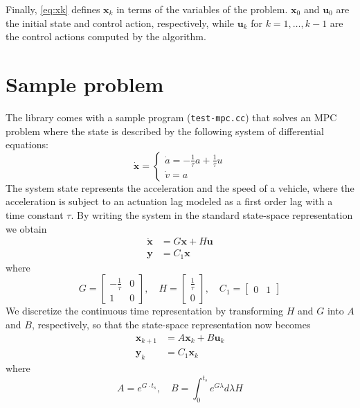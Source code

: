 \documentclass[10pt,a4paper]{article}
\newcommand{\xk}{\ensuremath{\bm{x}_k}\xspace}
\newcommand{\yk}{\ensuremath{\bm{y}_k}\xspace}
\newcommand{\xkk}{\ensuremath{\bm{x}_{k+1}}\xspace}
\newcommand{\xx}[1]{\ensuremath{\bm{x}_{#1}}\xspace}
\newcommand{\uk}{\ensuremath{\bm{u}_k}\xspace}
\newcommand{\uu}[1]{\ensuremath{\bm{u}_{#1}}\xspace}
\newcommand{\ts}{\ensuremath{t_s}}
\newcommand{\Co}{\ensuremath{C_1}}
\begin{document}
Finally, \cref{eq:xk} defines \xk in terms of the variables of the problem.
\xx{0} and \uu{0} are the initial state and control action, respectively, while \uk for $k = 1,\dots,k-1$ are the control actions computed by the algorithm.

\section{Sample problem}

The library comes with a sample program (\texttt{test-mpc.cc}) that solves an MPC problem where the state is described by the following system of differential equations:
\begin{equation}
    \dot{\bm{x}} = \begin{cases}
        \dot{a} = -\frac{1}{\tau} a + \frac{1}{\tau} u\\
        \dot{v} = a
    \end{cases}
\end{equation}
The system state represents the acceleration and the speed of a vehicle, where the acceleration is subject to an actuation lag modeled as a first order lag with a time constant $\tau$.
By writing the system in the standard state-space representation we obtain
\begin{align}
    \dot{\bm{x}} &= G\bm{x} + H\bm{u}\\
    \bm{y} &= \Co\bm{x}
\end{align}
where
\begin{equation}
    G = \begin{bmatrix}-\frac{1}{\tau} & 0\\1 & 0\end{bmatrix},\quad H = \begin{bmatrix}\frac{1}{\tau}\\0\end{bmatrix},\quad \Co = \begin{bmatrix}0 & 1\end{bmatrix}
\end{equation}
We discretize the continuous time representation by transforming $H$ and $G$ into $A$ and $B$, respectively, so that the state-space representation now becomes
\begin{align}
    \xkk &= A\xk + B\uk\\
    \yk &= \Co\xk
\end{align}
where
\begin{equation}
    A = e^{G \cdot \ts},\quad B = \int_0^{\ts} e^{G \lambda} d\lambda H
\end{equation}
\end{document}
